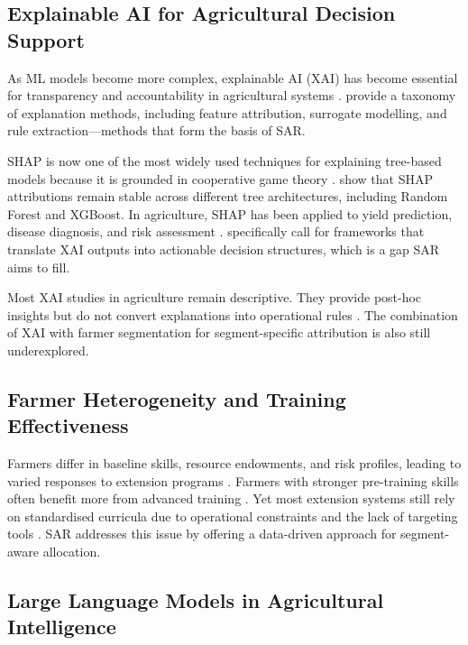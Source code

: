 \documentclass[3p,twocolumn,authoryear]{elsarticle}
\begin{document}
\subsection{Explainable AI for Agricultural Decision Support}

As ML models become more complex, explainable AI (XAI) has become essential for
transparency and accountability in agricultural systems
\citep{arrieta2020,linardatos2021}. \citet{guidotti2019} provide a taxonomy of
explanation methods, including feature attribution, surrogate modelling, and
rule extraction—methods that form the basis of SAR.

SHAP is now one of the most widely used techniques for explaining tree-based
models because it is grounded in cooperative game theory \citep{lundberg2017}.
\citet{lundberg2020} show that SHAP attributions remain stable across different
tree architectures, including Random Forest and XGBoost. In agriculture, SHAP
has been applied to yield prediction, disease diagnosis, and risk assessment
\citep{ghosal2018,ryo2022}. \citet{ryo2022} specifically call for frameworks
that translate XAI outputs into actionable decision structures, which is a gap
SAR aims to fill.

Most XAI studies in agriculture remain descriptive. They provide post-hoc
insights but do not convert explanations into operational rules
\citep{linardatos2021,arrieta2020}. The combination of XAI with farmer
segmentation for segment-specific attribution is also still underexplored.

\subsection{Farmer Heterogeneity and Training Effectiveness}

Farmers differ in baseline skills, resource endowments, and risk profiles,
leading to varied responses to extension programs \citep{feder1985,anderson2004}.
Farmers with stronger pre-training skills often benefit more from advanced
training \citep{davis2012}. Yet most extension systems still rely on
standardised curricula due to operational constraints and the lack of targeting
tools \citep{anderson2004}. SAR addresses this issue by offering a data-driven
approach for segment-aware allocation.

\subsection{Large Language Models in Agricultural Intelligence}
\end{document}
